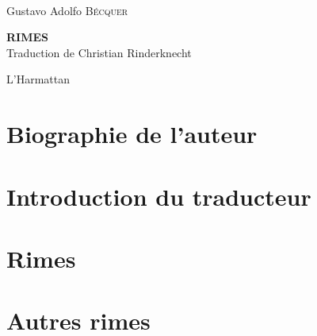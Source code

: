 \documentclass[a4paper,fontsize=13pt,twoside,final]{scrbook}
\begin{document}
\pagestyle{empty}





\cleardoublepage
\
\cleardoublepage
\
\cleardoublepage
\

\begin{center}
  {\Large Gustavo Adolfo \textsc{Bécquer}}
\end{center}

\bigskip\bigskip\bigskip\bigskip\bigskip\bigskip

\begin{center}
 {\Huge\textbf{RIMES}} \\
 \bigskip\bigskip
 Traduction de Christian Rinderknecht
\end{center}

\bigskip\bigskip\bigskip

\vfill
\begin{center}
L'Harmattan
\end{center}

\clearpage

\pagestyle{plain}


\part{Biographie de l'auteur}


\part{Introduction du traducteur}



\part{Rimes}


\part{Autres rimes}


\bigskip

\tableofcontents
\end{document}
